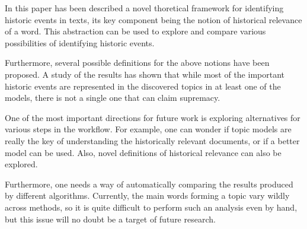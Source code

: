 
In this paper has been described a novel thoretical framework for identifying historic events in texts, its key component being the notion of historical relevance of a word. This abstraction can be used to explore and compare various possibilities of identifying historic events.

Furthermore, several possible definitions for the above notions have been proposed. A study of the results has shown that while most of the important historic events are represented in the discovered topics in at least one of the models, there is not a single one that can claim supremacy.

One of the most important directions for future work is exploring alternatives for various steps in the workflow. For example, one can wonder if topic models are really the key of understanding the historically relevant documents, or if a better model can be used. Also, novel definitions of historical relevance can also be explored.

Furthermore, one needs a way of automatically comparing the results produced by different algorithms. Currently, the main words forming a topic vary wildly across methods, so it is quite difficult to perform such an analysis even by hand, but this issue will no doubt be a target of future research.
